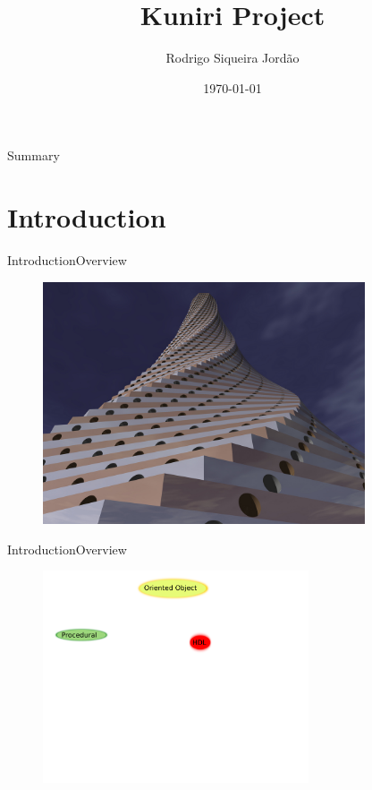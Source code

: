 \documentclass[10pt]{beamer}
\title[] { 
\textbf{Kuniri Project}
}
\subtitle[An overview] {
}
\author[kuniri presentation] {
Rodrigo Siqueira Jordão
}
\date{\today}
\begin{document}

{\1%
\begin{frame} 
  \titlepage %
\end{frame}
}

\begin{frame}{Summary}{}
  \tableofcontents
\end{frame}

\section{Introduction}
\begin{frame}{Introduction}{Overview}
  \begin{figure}[ht]
    \centering
    \includegraphics[width=0.85\textwidth, keepaspectratio=true]{images/introduction.jpg}
  \end{figure}
\end{frame}

\begin{frame}{Introduction}{Overview}
  \begin{figure}[overview]
    \includegraphics[width=0.7\textwidth]{images/paradigms.png}
  \end{figure}
\end{frame}
\end{document}
